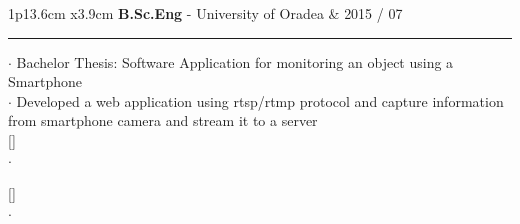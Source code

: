 \documentclass[10pt,A4]{article}
\newcommand\AddAdditional[1]{
%
	\StrLen{#1}[\MyStrLen]%
	\ifthenelse{\equal{\MyStrLen}{1}}%
	{\\}{ $\cdot$ #1\\[6pt]}
}
\newcommand{\cvevent}[7]
{

\begin{tabular*}{1\textwidth}{p{13.6cm}  x{3.9cm}}
	\textbf{#2} - \textcolor{bgcol}{#3} &   \vspace{2.5pt}\textcolor{sectcol}{#1}
\end{tabular*}

\vspace{-8pt}
\textcolor{softcol}{\hrule}
\vspace{6pt}

  $\cdot$ #4\\[3pt]
  $\cdot$ #5\\[6pt]
	\AddAdditional{#6}
	\AddAdditional{#7}
}
\newcommand{\mystrut}{\rule[-.3\baselineskip]{0pt}{\baselineskip}}
\begin{document}
%
\cvevent{2015 / 07}{B.Sc.Eng}{University of Oradea}{Bachelor Thesis: Software Application for monitoring an object using a Smartphone}{Developed a web application using rtsp/rtmp protocol and capture information from smartphone camera and stream it to a server}{}{}


%


%


\null
\vspace*{\fill}
\hspace{-0.25\linewidth}\colorbox{white}{\makebox[1.5\linewidth][c]{\mystrut  \textnormal{\textcolor{sectcol}{} $\cdot$ \textcolor{sectcol}{github.com/alexghi} $\cdot$}}}




%
%
%
%
%
%
\end{document}

